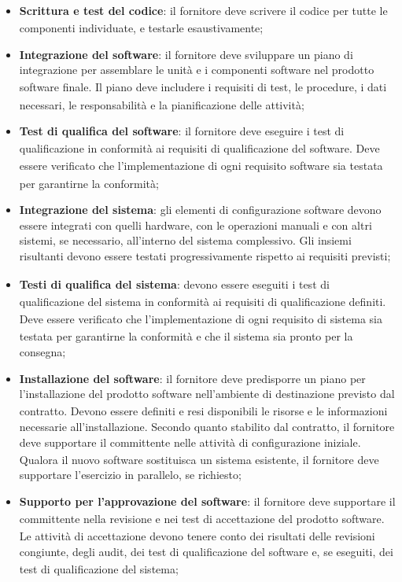 \documentclass[a4paper,11pt]{article}
\newcommand{\G}{\textsubscript{\scalebox{0.6}{\textbf{G}}}}
\begin{document}
\begin{itemize}
    \item \textbf{Scrittura e test\G{} del codice}: il fornitore deve scrivere il codice per tutte le componenti individuate, e testarle esaustivamente;
    \item \textbf{Integrazione del software}: il fornitore deve sviluppare un piano di integrazione per assemblare le unità e i componenti software nel prodotto\G{} software finale. Il piano deve includere i requisiti\G{} di test\G{}, le procedure, i dati necessari, le responsabilità e la pianificazione delle attività;
    \item \textbf{Test\G{} di qualifica del software}: il fornitore deve eseguire i test\G{} di qualificazione in conformità ai requisiti\G{} di qualificazione del software. Deve essere verificato che l'implementazione\G{} di ogni requisito\G{} software sia testata per garantirne la conformità;
    \item \textbf{Integrazione del sistema}: gli elementi di configurazione software devono essere integrati con quelli hardware, con le operazioni manuali e con altri sistemi, se necessario, all'interno del sistema complessivo. Gli insiemi risultanti devono essere testati progressivamente rispetto ai requisiti\G{} previsti;
    \item \textbf{Testi di qualifica del sistema}: devono essere eseguiti i test\G{} di qualificazione del sistema in conformità ai requisiti\G{} di qualificazione definiti. Deve essere verificato che l'implementazione\G{} di ogni requisito\G{} di sistema sia testata per garantirne la conformità e che il sistema sia pronto per la consegna;
    \item \textbf{Installazione del software}: il fornitore deve predisporre un piano per l'installazione del prodotto\G{} software nell'ambiente di destinazione previsto dal contratto. Devono essere definiti e resi disponibili le risorse e le informazioni necessarie all'installazione. Secondo quanto stabilito dal contratto, il fornitore deve supportare il committente\G{} nelle attività di configurazione iniziale. Qualora il nuovo software sostituisca un sistema esistente, il fornitore deve supportare l'esercizio in parallelo, se richiesto;
    \item \textbf{Supporto per l'approvazione\G{} del software}: il fornitore deve supportare il committente\G{} nella revisione e nei test\G{} di accettazione del prodotto\G{} software. Le attività di accettazione devono tenere conto dei risultati delle revisioni congiunte, degli audit, dei test\G{} di qualificazione del software e, se eseguiti, dei test\G{} di qualificazione del sistema; 
\end{itemize}
\end{document}
